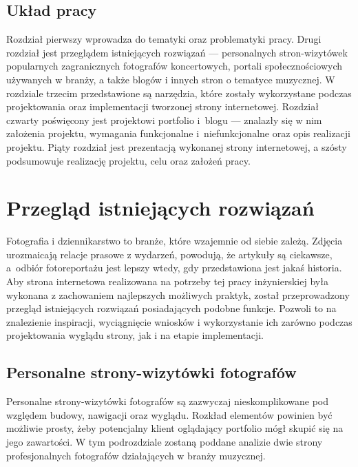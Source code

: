 \documentclass[a4paper, 12pt]{article}
\numberwithin{figure}{section}
\begin{document}
\begin{sloppypar}

\subsection{Układ pracy}

Rozdział pierwszy wprowadza do tematyki oraz problematyki pracy. Drugi rozdział jest przeglądem istniejących rozwiązań --- personalnych stron-wizytówek popularnych zagranicznych fotografów koncertowych, portali społecznościowych używanych w branży, a także blogów i innych stron o tematyce muzycznej. W rozdziale trzecim przedstawione są narzędzia, które zostały wykorzystane podczas projektowania oraz implementacji tworzonej strony internetowej. Rozdział czwarty poświęcony jest projektowi portfolio i~blogu --- znalazły się w nim założenia projektu, wymagania funkcjonalne i~niefunkcjonalne oraz opis realizacji projektu. Piąty rozdział jest prezentacją wykonanej strony internetowej, a szósty podsumowuje realizację projektu, celu oraz założeń pracy.


\newpage

\section{Przegląd istniejących rozwiązań} \label{przeglad}

Fotografia i dziennikarstwo to branże, które wzajemnie od siebie zależą. Zdjęcia urozmaicają relacje prasowe z wydarzeń, powodują, że artykuły są ciekawsze, a~odbiór fotoreportażu jest lepszy wtedy, gdy przedstawiona jest jakaś historia. Aby strona internetowa realizowana na potrzeby tej pracy inżynierskiej była wykonana z zachowaniem najlepszych możliwych praktyk, został przeprowadzony przegląd istniejących rozwiązań posiadających podobne funkcje. Pozwoli to na znalezienie inspiracji, wyciągnięcie wniosków i wykorzystanie ich zarówno podczas projektowania wyglądu strony, jak i na etapie implementacji.


\subsection{Personalne strony-wizytówki fotografów}

Personalne strony-wizytówki fotografów są zazwyczaj nieskomplikowane pod względem budowy, nawigacji oraz wyglądu. Rozkład elementów powinien być możliwie prosty, żeby potencjalny klient oglądający portfolio mógł skupić się na jego zawartości. W tym podrozdziale zostaną poddane analizie dwie strony profesjonalnych fotografów działających w branży muzycznej.


\end{sloppypar}
\end{document}
